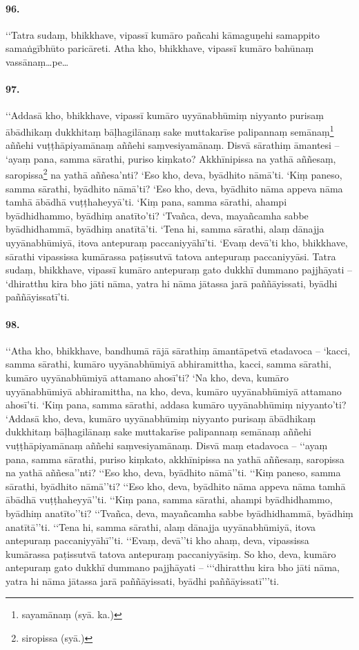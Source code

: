 \paragraph{96.} ‘‘Tatra sudaṃ, bhikkhave, vipassī kumāro pañcahi kāmaguṇehi samappito samaṅgībhūto paricāreti. Atha kho, bhikkhave, vipassī kumāro bahūnaṃ vassānaṃ…pe…

\paragraph{97.} ‘‘Addasā kho, bhikkhave, vipassī kumāro uyyānabhūmiṃ niyyanto purisaṃ ābādhikaṃ dukkhitaṃ bāḷhagilānaṃ sake muttakarīse palipannaṃ semānaṃ\footnote{sayamānaṃ (syā. ka.)} aññehi vuṭṭhāpiyamānaṃ aññehi saṃvesiyamānaṃ. Disvā sārathiṃ āmantesi – ‘ayaṃ pana, samma sārathi, puriso kiṃkato? Akkhīnipissa na yathā aññesaṃ, saropissa\footnote{siropissa (syā.)} na yathā aññesa’nti? ‘Eso kho, deva, byādhito nāmā’ti. ‘Kiṃ paneso, samma sārathi, byādhito nāmā’ti? ‘Eso kho, deva, byādhito nāma appeva nāma tamhā ābādhā vuṭṭhaheyyā’ti. ‘Kiṃ pana, samma sārathi, ahampi byādhidhammo, byādhiṃ anatīto’ti? ‘Tvañca, deva, mayañcamha sabbe byādhidhammā, byādhiṃ anatītā’ti. ‘Tena hi, samma sārathi, alaṃ dānajja uyyānabhūmiyā, itova antepuraṃ paccaniyyāhī’ti. ‘Evaṃ devā’ti kho, bhikkhave, sārathi vipassissa kumārassa paṭissutvā tatova antepuraṃ paccaniyyāsi. Tatra sudaṃ, bhikkhave, vipassī kumāro antepuraṃ gato dukkhī dummano pajjhāyati – ‘dhiratthu kira bho jāti nāma, yatra hi nāma jātassa jarā paññāyissati, byādhi paññāyissatī’ti.

\paragraph{98.} ‘‘Atha kho, bhikkhave, bandhumā rājā sārathiṃ āmantāpetvā etadavoca – ‘kacci, samma sārathi, kumāro uyyānabhūmiyā abhiramittha, kacci, samma sārathi, kumāro uyyānabhūmiyā attamano ahosī’ti? ‘Na kho, deva, kumāro uyyānabhūmiyā abhiramittha, na kho, deva, kumāro uyyānabhūmiyā attamano ahosī’ti. ‘Kiṃ pana, samma sārathi, addasa kumāro uyyānabhūmiṃ niyyanto’ti? ‘Addasā kho, deva, kumāro uyyānabhūmiṃ niyyanto purisaṃ ābādhikaṃ dukkhitaṃ bāḷhagilānaṃ sake muttakarīse palipannaṃ semānaṃ aññehi vuṭṭhāpiyamānaṃ aññehi saṃvesiyamānaṃ. Disvā maṃ etadavoca – ‘‘ayaṃ pana, samma sārathi, puriso kiṃkato, akkhīnipissa na yathā aññesaṃ, saropissa na yathā aññesa’’nti? ‘‘Eso kho, deva, byādhito nāmā’’ti. ‘‘Kiṃ paneso, samma sārathi, byādhito nāmā’’ti? ‘‘Eso kho, deva, byādhito nāma appeva nāma tamhā ābādhā vuṭṭhaheyyā’’ti. ‘‘Kiṃ pana, samma sārathi, ahampi byādhidhammo, byādhiṃ anatīto’’ti? ‘‘Tvañca, deva, mayañcamha sabbe byādhidhammā, byādhiṃ anatītā’’ti. ‘‘Tena hi, samma sārathi, alaṃ dānajja uyyānabhūmiyā, itova antepuraṃ paccaniyyāhī’’ti. ‘‘Evaṃ, devā’’ti kho ahaṃ, deva, vipassissa kumārassa paṭissutvā tatova antepuraṃ paccaniyyāsiṃ. So kho, deva, kumāro antepuraṃ gato dukkhī dummano pajjhāyati – ‘‘‘dhiratthu kira bho jāti nāma, yatra hi nāma jātassa jarā paññāyissati, byādhi paññāyissatī’’’ti.

